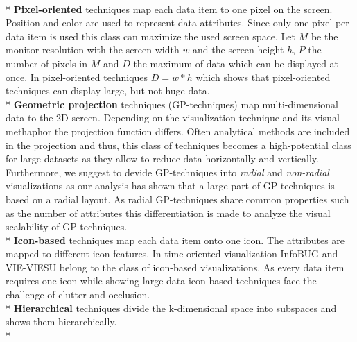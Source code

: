\\*
\textbf{Pixel-oriented} techniques map each data item to one pixel on the screen. Position and color are used to represent data attributes\cite{Keim1996}.
Since only one pixel per data item is used this class can maximize the used screen space. 
Let $M$ be the monitor resolution with the screen-width $w$ and the screen-height $h$, $P$ the number of pixels in $M$ and $D$ the maximum of data which can be displayed at once. In pixel-oriented techniques  
\begin{math}
D = w*h
\end{math}
which shows that pixel-oriented techniques can display large, but not huge data.  
\\*
\textbf{Geometric projection} techniques (GP-techniques) map multi-dimensional data to the 2D screen\cite{FerreiradeOliveira2003}. Depending on the visualization technique and its visual methaphor the projection function differs. Often analytical methods are included in the projection and thus, this class of techniques becomes a high-potential class for large datasets as they allow to reduce data horizontally and vertically.
Furthermore, we suggest to devide GP-techniques into \textit{radial} and \textit{non-radial} visualizations\cite{Diehl2010} as our analysis has shown that a large part of GP-techniques is based on a radial layout. As radial GP-techniques share common properties such as the number of attributes this differentiation is made to analyze the visual scalability of GP-techniques.
\\*
\textbf{Icon-based} techniques map each data item onto one icon. The attributes are mapped to different icon features\cite{Keim2001}. In time-oriented visualization InfoBUG and VIE-VIESU belong to the class of icon-based visualizations. As every data item requires one icon while showing large data icon-based techniques face the challenge of clutter and occlusion\cite{Borgo2013}.
\\*
\textbf{Hierarchical} techniques divide the k-dimensional space into subspaces and shows them hierarchically. 
\\*



